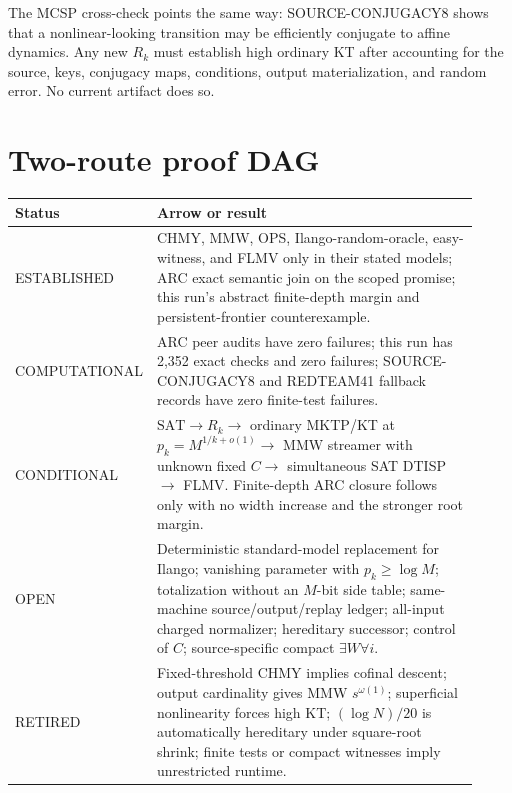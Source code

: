 \documentclass[11pt]{article}
\begin{document}
The MCSP cross-check points the same way: SOURCE-CONJUGACY8 shows that a
nonlinear-looking transition may be efficiently conjugate to affine dynamics.
Any new $R_k$ must establish high ordinary KT after accounting for the source,
keys, conjugacy maps, conditions, output materialization, and random error.
No current artifact does so.

\section*{Two-route proof DAG}
\begin{center}
\begin{tabular}{p{0.18\linewidth}p{0.74\linewidth}}
\toprule
Status & Arrow or result\\
\midrule
ESTABLISHED & CHMY, MMW, OPS, Ilango-random-oracle, easy-witness, and FLMV only in their stated models; ARC exact semantic join on the scoped promise; this run's abstract finite-depth margin and persistent-frontier counterexample.\\
COMPUTATIONAL & ARC peer audits have zero failures; this run has 2,352 exact checks and zero failures; SOURCE-CONJUGACY8 and REDTEAM41 fallback records have zero finite-test failures.\\
CONDITIONAL & $\mathrm{SAT}\to R_k\to$ ordinary MKTP/KT at $p_k=M^{1/k+o(1)}\to$ MMW streamer with unknown fixed $C\to$ simultaneous SAT DTISP $\to$ FLMV. Finite-depth ARC closure follows only with no width increase and the stronger root margin.\\
OPEN & Deterministic standard-model replacement for Ilango; vanishing parameter with $p_k\geq\log M$; totalization without an $M$-bit side table; same-machine source/output/replay ledger; all-input charged normalizer; hereditary successor; control of $C$; source-specific compact $\exists W\forall i$.\\
RETIRED & Fixed-threshold CHMY implies cofinal descent; output cardinality gives MMW $s^{\omega(1)}$; superficial nonlinearity forces high KT; $(\log N)/20$ is automatically hereditary under square-root shrink; finite tests or compact witnesses imply unrestricted runtime.\\
\bottomrule
\end{tabular}
\end{center}
\end{document}
